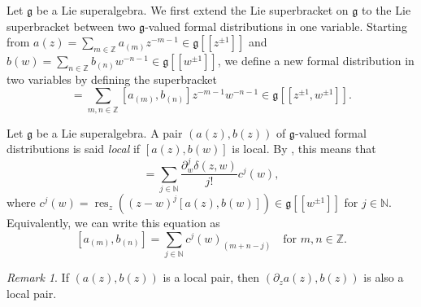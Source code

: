 \documentclass[a4paper, 12pt, reqno]{amsart}
\theoremstyle{remark}
\newtheorem{remark}[theorem]{Remark}
\DeclareMathOperator{\res}{res}
\begin{document}
Let $\mathfrak{g}$ be a Lie superalgebra.
We first extend the Lie superbracket on $\mathfrak{g}$ to the Lie superbracket between two $\mathfrak{g}$-valued formal distributions in one variable.
Starting from $a(z) = \sum_{m \in \mathbb{Z}}a_{(m)}z^{-m - 1} \in \mathfrak{g}[[z^{\pm1}]]$ and $b(w) = \sum_{n \in \mathbb{Z}}b_{(n)}w^{-n - 1} \in \mathfrak{g}[[w^{\pm1}]]$, we define a new formal distribution in two variables by defining the superbracket
\begin{equation*}
  [a(z), b(w)] = \sum_{m, n \in \mathbb{Z}}[a_{(m)}, b_{(n)}]z^{-m - 1}w^{-n - 1} \in \mathfrak{g}[[z^{\pm1}, w^{\pm1}]].
\end{equation*}

Let $\mathfrak{g}$ be a Lie superalgebra.
A pair $(a(z), b(z))$ of $\mathfrak{g}$-valued formal distributions is said \emph{local} if $[a(z), b(w)]$ is local.
By , this means that
\begin{equation*}
  [a(z), b(w)] = \sum_{j \in \mathbb{N}}\frac{\partial^j_w\delta(z, w)}{j!}c^j(w),
\end{equation*}
where $c^j(w) = \res_z((z - w)^j[a(z), b(w)]) \in \mathfrak{g}[[w^{\pm1}]]$ for $j \in \mathbb{N}$.
Equivalently, we can write this equation as
\begin{equation}
  \label{eq:1}
  [a_{(m)}, b_{(n)}] = \sum_{j \in \mathbb{N}}c^j(w)_{(m + n - j)} \quad \text{for $m, n \in \mathbb{Z}$}.
\end{equation}

\begin{remark}
  \label{rmk:4}
  If $(a(z), b(z))$ is a local pair, then $(\partial_za(z), b(z))$ is also a local pair.
\end{remark}
\end{document}
